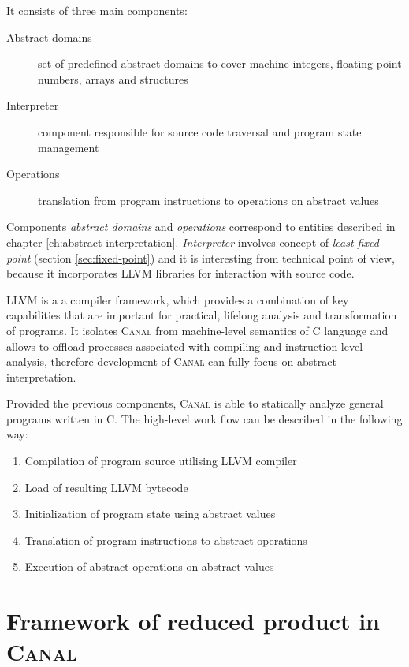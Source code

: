 \documentclass[12pt,oneside]{fithesis2}
\theoremstyle{definition}
\begin{document}
It consists of three main components:

\begin{description}
  \item[Abstract domains] set of predefined abstract domains to cover machine integers, floating point numbers, arrays and structures
  \item[Interpreter] component responsible for source code traversal and program state management
  \item[Operations] translation from program instructions to operations on abstract values
\end{description}

Components \textit{abstract domains} and \textit{operations} correspond to entities described in chapter \ref{ch:abstract-interpretation}. \textit{Interpreter} involves concept of \textit{least fixed point} (section \ref{sec:fixed-point}) and it is interesting from technical point of view, because it incorporates LLVM libraries for interaction with source code.

LLVM is a a compiler framework, which provides a combination of key capabilities that are important for practical, lifelong analysis and
transformation of programs. \cite{llvm} It isolates \textsc{Canal} from machine-level semantics of C language and allows to offload processes associated with compiling and instruction-level analysis, therefore development of \textsc{Canal} can fully focus on abstract interpretation.

Provided the previous components, \textsc{Canal} is able to statically analyze general programs written in C. The high-level work flow can be described in the following way:

\begin{enumerate}
  \item Compilation of program source utilising LLVM compiler
  \item Load of resulting LLVM bytecode
  \item Initialization of program state using abstract values
  \item Translation of program instructions to abstract operations
  \item Execution of abstract operations on abstract values
\end{enumerate}

\section{Framework of reduced product in \textsc{Canal}}
\end{document}
